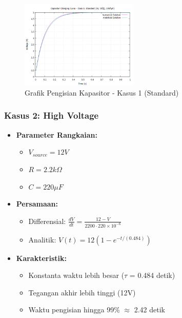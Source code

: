 \documentclass[conference]{IEEEtran}
\begin{document}
\begin{figure}[H]
    \centering
    \includegraphics[width=0.5\textwidth]{Grafik/Grafik1.png}
    \caption{Grafik Pengisian Kapasitor - Kasus 1 (Standard)}
    \label{fig:case1}
\end{figure}

\subsubsection{Kasus 2: High Voltage}
\begin{itemize}
\item \textbf{Parameter Rangkaian:}
  \begin{itemize}
  \item $V_{source} = 12V$
  \item $R = 2.2k\Omega$
  \item $C = 220\mu F$
  \end{itemize}
\item \textbf{Persamaan:}
  \begin{itemize}
  \item Differensial: $\frac{dV}{dt} = \frac{12 - V}{2200 \cdot 220\times10^{-6}}$
  \item Analitik: $V(t) = 12(1 - e^{-t/(0.484)})$
  \end{itemize}
\item \textbf{Karakteristik:}
  \begin{itemize}
  \item Konstanta waktu lebih besar ($\tau$ = 0.484 detik)
  \item Tegangan akhir lebih tinggi (12V)
  \item Waktu pengisian hingga 99\% $\approx$ 2.42 detik
  \end{itemize}
\end{itemize}
\end{document}
